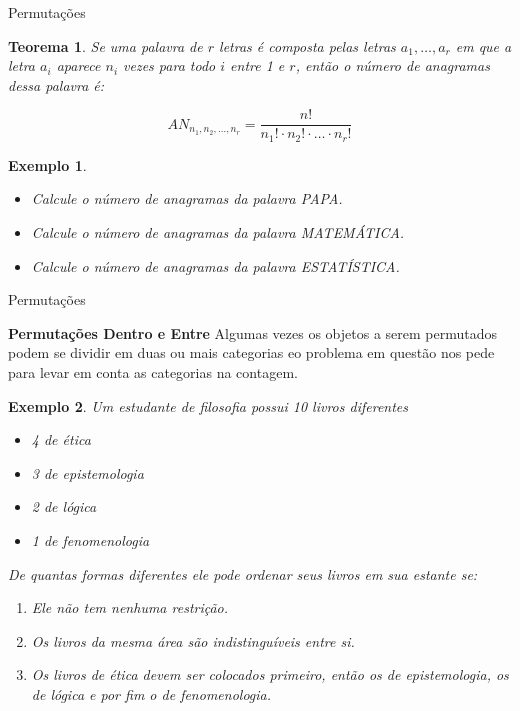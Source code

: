 \documentclass{beamer}
\newtheorem{teorema}{Teorema}
\newtheorem{exemplo}{Exemplo}
\begin{document}
\begin{frame}{Permutações}
\begin{teorema}
    Se uma palavra de $r$ letras é composta pelas letras $a_1, \dots, a_r$ em que a letra $a_i$ aparece $n_i$ vezes para todo $i$ entre 1 e $r$, então o número de anagramas dessa palavra é:

    $$AN_{n_1, n_2, \dots, n_r} = \dfrac{n!}{n_1! \cdot n_2! \cdot \dots \cdot n_r!}$$
\end{teorema}

   \begin{exemplo}
   \begin{itemize}
       \item Calcule o número de anagramas da palavra PAPA.
       \item Calcule o número de anagramas da palavra MATEMÁTICA.
       \item Calcule o número de anagramas da palavra ESTATÍSTICA.
   \end{itemize}   
   \end{exemplo}
\end{frame}

\begin{frame}{Permutações}

\textbf{Permutações Dentro e Entre}
    Algumas vezes os objetos a serem permutados podem se dividir em duas ou mais categorias eo problema em questão nos pede para levar em conta as categorias na contagem.
    \begin{exemplo}
        Um estudante de filosofia possui 10 livros diferentes
        \begin{itemize}
            \item 4 de ética
            \item 3 de epistemologia
            \item 2 de lógica
            \item 1 de fenomenologia
        \end{itemize}

        De quantas formas diferentes ele pode ordenar seus livros em sua estante se:
        \begin{enumerate}
            \item Ele não tem nenhuma restrição.
            \item Os livros da mesma área são indistinguíveis entre si.
            \item Os livros de ética devem ser colocados primeiro, então os de epistemologia, os de lógica e por fim o de fenomenologia.
        \end{enumerate}
    \end{exemplo}
\end{frame}
\end{document}
